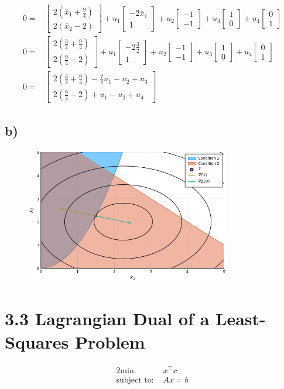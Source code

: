 \documentclass{article}
\begin{document}
	\begin{align}
		0 = & \begin{bmatrix} 2(\bar{x}_1 +\frac{9}{4}) \\ 2(\bar{x}_2 -2)\end{bmatrix} + u_1 \begin{bmatrix} -2\bar{x}_1 \\ 1 \end{bmatrix} + u_2 \begin{bmatrix} -1 \\ -1 \end{bmatrix} + u_3 \begin{bmatrix} 1 \\ 0 \end{bmatrix} + u_4 \begin{bmatrix} 0 \\ 1 \end{bmatrix}\\
		0 = & \begin{bmatrix} 2(\frac{3}{2} +\frac{9}{4}) \\ 2(\frac{9}{4} -2)\end{bmatrix} + u_1 \begin{bmatrix} -2\frac{3}{2} \\ 1 \end{bmatrix} + u_2 \begin{bmatrix} -1 \\ -1 \end{bmatrix} + u_3 \begin{bmatrix} 1 \\ 0 \end{bmatrix} + u_4 \begin{bmatrix} 0 \\ 1 \end{bmatrix} \\
		0 = & \begin{bmatrix}2(\frac{3}{2} +\frac{9}{4}) -\frac{7}{2}u_1 - u_2 +u_3 \\ 2(\frac{9}{4} -2) +u_1 -u_2 +u_4
		\end{bmatrix}
	\end{align}
\subsection*{b)}
	\begin{figure}[H]
		\includegraphics[width=0.8\textwidth]{3_2.png}
		\caption{}
		\label{fig:2a}
	\end{figure}
\section*{3.3 Lagrangian Dual of a Least-Squares Problem}
	\begin{alignat}{2}
		\text{min. } & x^\top x \\
		\text{subject to: } & Ax=b	
	\end{alignat}
\end{document}
